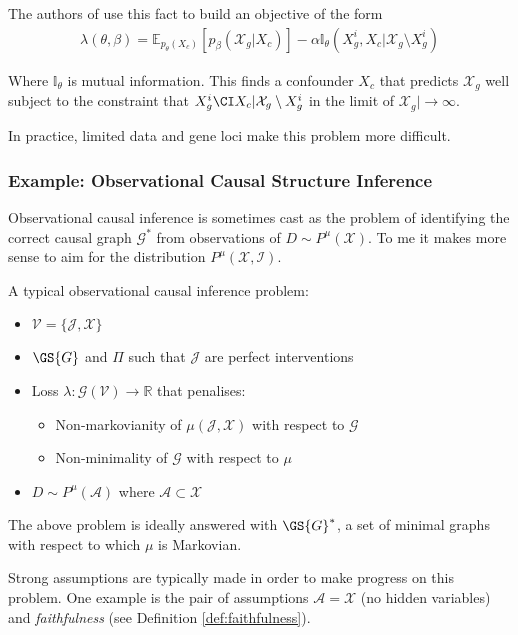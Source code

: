 The authors of \cite{ranganath_multiple_2018} use this fact to build an objective of the form
\begin{align}
    \lambda(\theta,\beta)=\mathbb{E}_{p_\theta(X_c)}[p_\beta (\mathcal{X}_g|X_c)]-\alpha \mathbb{I}_\theta (X_g^i,X_c|\mathcal{X}_g\setminus X_g^i)
\end{align}

Where $\mathbb{I}_\theta$ is mutual information. This finds a confounder $X_c$ that predicts $\mathcal{X}_g$ well subject to the constraint that $X^i_g \CI X_c | \mathcal{X}_g\setminus X^i_g$ in the limit of $\mathcal{X}_g|\to \infty$. 

In practice, limited data and gene loci make this problem more difficult.

\subsubsection{Example: Observational Causal Structure Inference}

Observational causal inference is sometimes cast as the problem of identifying the correct causal graph $\mathscr{G}^*$ from observations of $D\sim P^\mu(\mathcal{X})$. To me it makes more sense to aim for the distribution $P^\mu(\mathcal{X},\mathcal{I})$.

A typical observational causal inference problem:

\begin{itemize}
    \item $\mathcal{V}=\{\mathcal{J},\mathcal{X}\}$
    \item $\GS{G}$ and $\Pi$ such that $\mathcal{J}$ are perfect interventions
    \item Loss $\lambda:\mathscr{G}(\mathcal{V})\to\mathbb{R}$ that penalises:
    \begin{itemize}
        \item Non-markovianity of $\mu(\mathcal{J},\mathcal{X})$ with respect to $\mathcal{G}$
        \item Non-minimality of $\mathscr{G}$ with respect to $\mu$
    \end{itemize}
    \item $D\sim P^\mu(\mathcal{A})$ where $\mathcal{A}\subset\mathcal{X}$
\end{itemize}

The above problem is ideally answered with $\GS{G}^*$, a set of minimal graphs with respect to which $\mu$ is Markovian.

Strong assumptions are typically made in order to make progress on this problem. One example is the pair of assumptions $\mathcal{A}=\mathcal{X}$ (no hidden variables) and 
\emph{faithfulness} (see Definition \ref{def:faithfulness}).

